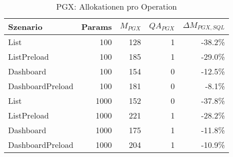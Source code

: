 
\begin{table}[ht]
\centering
\caption{PGX: Allokationen pro Operation}
\begin{tabular}{lrrrr}
\toprule
Szenario & Params & ${M_{PGX}}$ & ${QA_{PGX}}$ & ${\Delta M_{PGX,SQL}}$ \\
\midrule

	List & 100 & 128 & 1 & -38.2\% \\
	ListPreload & 100 & 185 & 1 & -29.0\% \\
	Dashboard & 100 & 154 & 0 & -12.5\% \\
	DashboardPreload & 100 & 181 & 0 & -8.1\% \\
	List & 1000 & 152 & 0 & -37.8\% \\
	ListPreload & 1000 & 221 & 1 & -28.2\% \\
	Dashboard & 1000 & 175 & 1 & -11.8\% \\
	DashboardPreload & 1000 & 204 & 1 & -10.9\% \\
\bottomrule
\end{tabular}
\label{tab:benchmark_pgx_allocsperop}
\end{table}
	